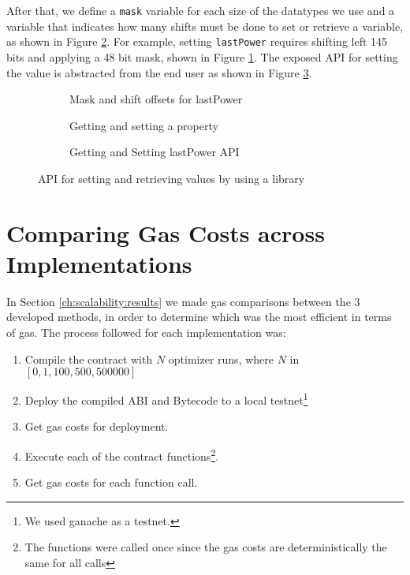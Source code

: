 

After that, we define a \texttt{mask} variable for each size of the datatypes we use and a variable that indicates how many shifts must be done to set or retrieve a variable, as shown in Figure \ref{fig:masking:a}. For example, setting \texttt{lastPower} requires shifting left 145 bits and applying a 48 bit mask, shown in Figure \ref{fig:masking:b}. The exposed API for setting the value is abstracted from the end user as shown in Figure \ref{fig:masking:c}.

\begin{figure}[H]
  \begin{subfigure}[b]{\textwidth}
    \centering
    
   \caption{Mask and shift offsets for lastPower}
    \label{fig:masking:b}
  \end{subfigure}

  \begin{subfigure}[b]{\textwidth}
    \centering
    
    \caption{Getting and setting a property}
    \label{fig:masking:a}
  \end{subfigure}

  \begin{subfigure}[b]{\textwidth}
    \centering
    
    \caption{Getting and Setting lastPower API}
    \label{fig:masking:c}
  \end{subfigure}

  \caption{API for setting and retrieving values by using a library}
  \label{apx:scalability:lib}
\end{figure}

\section{Comparing Gas Costs across Implementations}

In Section \ref{ch:scalability:results} we made gas comparisons between the 3 developed methods, in order to determine which was the most efficient in terms of gas. The process followed for each implementation was:

\begin{enumerate}
  \item Compile the contract with $N$ optimizer runs, where $N$ in $[0, 1, 100, 500, 500000]$ 
  \item Deploy the compiled ABI and Bytecode to a local testnet\footnote{We used ganache as a testnet.}
  \item Get gas costs for deployment.
  \item Execute each of the contract functions\footnote{The functions were called once since the gas costs are deterministically the same for all calls}.
  \item Get gas costs for each function call.
\end{enumerate}

